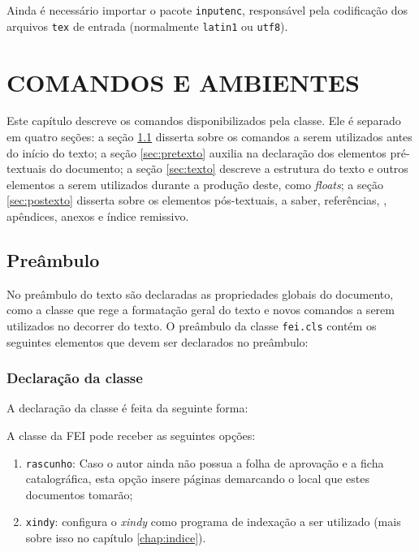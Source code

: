 \documentclass[xindy,rascunho]{fei}
\begin{document}
Ainda é necessário importar o pacote \texttt{inputenc}, responsável pela codificação dos arquivos \texttt{tex} de entrada (normalmente \texttt{latin1} ou \texttt{utf8}).

\chapter{COMANDOS E AMBIENTES}\label{chap:comandos}

Este capítulo descreve os comandos disponibilizados pela classe. Ele é separado em quatro seções: a seção \ref{sec:preambulo} disserta sobre os comandos a serem utilizados antes do início do texto; a seção \ref{sec:pretexto} auxilia na declaração dos elementos pré-textuais do documento; a seção \ref{sec:texto} descreve a estrutura do texto e outros elementos a serem utilizados durante a produção deste, como \emph{floats}; a seção \ref{sec:postexto} disserta sobre os elementos pós-textuais, a saber, referências, , apêndices, anexos e índice remissivo.
   
	\section{Preâmbulo}\label{sec:preambulo}

	No preâmbulo do texto são declaradas as propriedades globais do documento, como a classe que rege a formatação geral do texto e novos comandos a serem utilizados no decorrer do texto. O preâmbulo da classe \texttt{fei.cls} contém os seguintes elementos que devem ser declarados no preâmbulo:
	
	\subsection{Declaração da classe}

A declaração da classe é feita da seguinte forma:

	
	A classe da FEI pode receber as seguintes opções:

	\begin{enumerate}
	\item \texttt{rascunho}: Caso o autor ainda não possua a folha de aprovação e a ficha catalográfica, esta opção insere páginas demarcando o local que estes documentos tomarão;
	\item \texttt{xindy}: configura o \emph{xindy} como programa de indexação a ser utilizado (mais sobre isso no capítulo \ref{chap:indice}).
	\end{enumerate}
\end{document}

